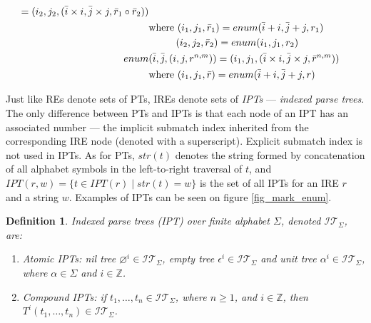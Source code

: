 \documentclass[AMA,STIX1COL]{WileyNJD-v2}
\newcommand{\XI}{\mathcal{I}}
\newcommand{\XIT}{\XI\!\XT}
\newcommand{\XT}{\mathcal{T}}
\newcommand{\YZ}{\mathbb{Z}}
\newcommand{\IPT}{I\!PT}
\newtheorem{Xdef}{Definition}
\begin{document}
\begin{align*}
\begin{aligned}
            = (i_2, j_2, (\bar{i} \times i, \bar{j} \times j, \bar{r}_1 \circ \bar{r}_2)) \\
            &\text{where }            (i_1, j_1, \bar{r}_1) = enum(\bar{i} + i, \bar{j} + j, r_1) \\
            &\space{\hphantom{where }}(i_2, j_2, \bar{r}_2) = enum(i_1, j_1, r_2)
        \\
        enum &(\bar{i}, \bar{j}, (i, j, r^{n,m})) = (i_1, j_1, (\bar{i} \times i, \bar{j} \times j, \bar{r}^{n,m})) \\
            &\text{where }
                (i_1, j_1, \bar{r}) = enum(\bar{i} + i, \bar{j} + j, r)
    \end{aligned}
    \end{align*}

Just like REs denote sets of PTs, IREs denote sets of \emph{IPTs} --- \emph{indexed parse trees}.
The only difference between PTs and IPTs is that each node of an IPT has an associated number ---
the implicit submatch index inherited from the corresponding IRE node (denoted with a superscript).
Explicit submatch index is not used in IPTs.
%
As for PTs, $str(t)$ denotes the string formed by concatenation of all alphabet symbols in the left-to-right traversal of $t$,
and $\IPT(r, w) = \{ t \in \IPT(r) \mid str(t) = w \}$ is the set of all IPTs for an IRE $r$ and a string $w$.
%
Examples of IPTs can be seen on figure \ref{fig_mark_enum}.

    \begin{Xdef}
    \emph{Indexed parse trees (IPT)} over finite alphabet $\Sigma$, denoted $\XIT_\Sigma$, are:
    \begin{enumerate}
        \item Atomic IPTs:
          \emph{nil tree} ${\varnothing}^i \in \XIT_\Sigma$,
          \emph{empty tree} ${\epsilon}^i \in \XIT_\Sigma$ and
          \emph{unit tree} ${\alpha}^i \in \XIT_\Sigma$, where $\alpha \in \Sigma$ and $i \in \YZ$.
        \item Compound IPTs: if $t_1, \dots, t_n \in \XIT_\Sigma$, where $n \geq 1$, and $i \in \YZ$, then
          ${T}^i(t_1, \dots, t_n) \in \XIT_\Sigma$.
    \end{enumerate}
    \end{Xdef}
\end{document}
